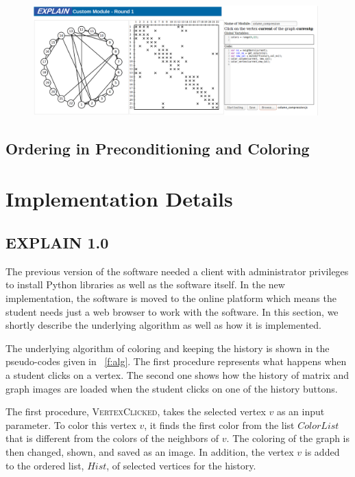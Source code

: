 \documentclass[12pt, oneside]{book}
\begin{document}
\begin{figure}
\centering
\includegraphics[width=0.98\textwidth]{custom}
\caption{}
\label{f.custom}
\end{figure}

\section{Ordering in Preconditioning and Coloring}


\chapter{Implementation Details}
\label{impl}
\section{EXPLAIN 1.0}
\label{s.impl.explain}
The previous version of the software \cite{Lulfesmann2010} needed a client with administrator privileges to install Python libraries as well as the software itself. In the new implementation, the software is moved to the online platform which means the student needs just a web browser to work with the software. In this section, we shortly describe the underlying algorithm as well as how it is implemented.

The underlying algorithm of coloring and keeping the history is shown in the pseudo-codes given in \figurename~\ref{f:alg}. The first procedure represents what happens when a student clicks on a vertex. The second one shows how the history of matrix and graph images are loaded when the student clicks on one of the history buttons.

The first procedure, \textsc{VertexClicked}, takes the selected vertex $v$ as an input parameter. To color this vertex $v$, it finds the first color from the list $ColorList$ that is different from the colors of the neighbors of $v$. The coloring of the graph is then changed, shown, and saved as an image. In addition, the vertex $v$ is added to the ordered list, $Hist$, of selected vertices for the history.
\end{document}
